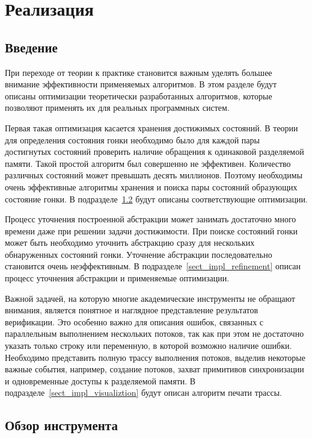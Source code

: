 \chapter{Реализация}
\label{chapter_implementation}

\section{Введение} \label{sect_impl_introduction}

При переходе от теории к практике становится важным уделять большее внимание эффективности применяемых алгоритмов.
В этом разделе будут описаны оптимизации теоретически разработанных алгоритмов, которые позволяют применять их для реальных программных систем. 

Первая такая оптимизация касается хранения достижимых состояний. В теории для определения состояния гонки необходимо было для каждой пары достигнутых состояний проверить наличие обращения к одинаковой разделяемой памяти. Такой простой алгоритм был совершенно не эффективен. Количество различных состояний может превышать десять миллионов. Поэтому необходимы очень эффективные алгоритмы хранения и поиска пары состояний образующих состояние гонки. В подразделе~\ref{sect_impl_storage} будут описаны соответствующие оптимизации.

Процесс уточнения построенной абстракции может занимать достаточно много времени даже при решении задачи достижимости. При поиске состояний гонки может быть необходимо уточнить абстракцию сразу для нескольких обнаруженных состояний гонки. Уточнение абстракции последовательно становится очень неэффективным. В подразделе~\ref{sect_impl_refinement} описан процесс уточнения абстракции и применяемые оптимизации.

Важной задачей, на которую многие академические инструменты не обращают внимания, является понятное и наглядное представление результатов верификации. Это особенно важно для описания ошибок, связанных с параллельным выполнением нескольких потоков, так как при этом не достаточно указать только строку или переменную, в которой возможно наличие ошибки. Необходимо представить полную трассу выполнения потоков, выделив некоторые важные события, например, создание потоков, захват примитивов синхронизации и одновременные доступы к разделяемой памяти. В подразделе~\ref{sect_impl_visualiztion} будут описан алгоритм печати трассы.

\section{Обзор инструмента} \label{sect_impl_storage}

